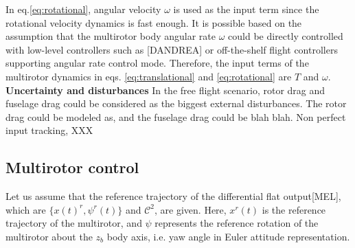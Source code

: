 \documentclass[letterpaper, 10 pt, conference]{ieeeconf}  %
\begin{document}
In eq.\eqref{eq:rotational}, angular velocity $\omega$ is used as the input term since the rotational velocity dynamics is fast enough. 
It is possible based on the assumption that the multirotor body angular rate $\omega$ could be directly controlled with low-level controllers such as [DANDREA] or off-the-shelf flight controllers supporting angular rate control mode.
Therefore, the input terms of the multirotor dynamics in eqs. \eqref{eq:translational} and \eqref{eq:rotational} are $T$ and $\omega$.
\\
\textbf{Uncertainty and disturbances}
In the free flight scenario, rotor drag and fuselage drag could be considered as the biggest external disturbances.
The rotor drag could be modeled as, and the fuselage drag could be blah blah.
Non perfect input tracking, XXX

\subsection{Multirotor control} \label{sec:controller}
Let us assume that the reference trajectory of the differential flat output[MEL], which are $\{x(t)^r,\psi^r(t)\}$ and $\mathcal{C}^2$, are given.
Here, ${x}^r(t)$ is the reference trajectory of the multirotor, and $\psi$ represents the reference rotation of the multirotor about the $z_b$ body axis, i.e. yaw angle in Euler attitude representation.
\end{document}
